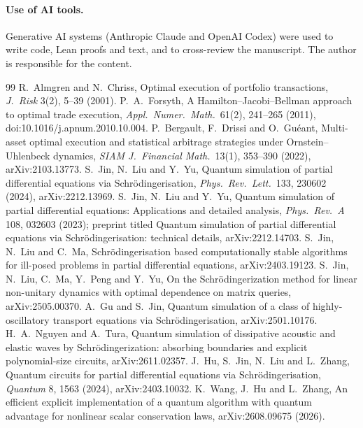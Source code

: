 \documentclass[11pt,a4paper]{article}
\theoremstyle{remark}
\begin{document}
\paragraph{Use of AI tools.} Generative AI systems (Anthropic Claude and OpenAI Codex) were used to write code, Lean proofs and text, and to
cross-review the manuscript. The author is responsible for the content.

\begin{thebibliography}{99}\small
{} R.~Almgren and N.~Chriss, Optimal execution of portfolio transactions, \emph{J.~Risk} 3(2), 5--39 (2001).
 P.~A.~Forsyth, A Hamilton--Jacobi--Bellman approach to optimal trade execution, \emph{Appl.~Numer.~Math.}~61(2), 241--265 (2011), doi:10.1016/j.apnum.2010.10.004.
 P.~Bergault, F.~Drissi and O.~Gu\'eant, Multi-asset optimal execution and statistical arbitrage strategies under Ornstein--Uhlenbeck dynamics, \emph{SIAM J.~Financial Math.}~13(1), 353--390 (2022), arXiv:2103.13773.
 S.~Jin, N.~Liu and Y.~Yu, Quantum simulation of partial differential equations via Schr\"odingerisation, \emph{Phys.~Rev.~Lett.}~133, 230602 (2024), arXiv:2212.13969.
 S.~Jin, N.~Liu and Y.~Yu, Quantum simulation of partial differential equations: Applications and detailed analysis, \emph{Phys.~Rev.~A} 108, 032603 (2023); preprint titled Quantum simulation of partial differential equations via Schr\"odingerisation: technical details, arXiv:2212.14703.
 S.~Jin, N.~Liu and C.~Ma, Schr\"odingerisation based computationally stable algorithms for ill-posed problems in partial differential equations, arXiv:2403.19123.
 S.~Jin, N.~Liu, C.~Ma, Y.~Peng and Y.~Yu, On the Schr\"odingerization method for linear non-unitary dynamics with optimal dependence on matrix queries, arXiv:2505.00370.
 A.~Gu and S.~Jin, Quantum simulation of a class of highly-oscillatory transport equations via Schr\"odingerisation, arXiv:2501.10176.
 H.~A.~Nguyen and A.~Tura, Quantum simulation of dissipative acoustic and elastic waves by Schr\"odingerization: absorbing boundaries and explicit polynomial-size circuits, arXiv:2611.02357.
 J.~Hu, S.~Jin, N.~Liu and L.~Zhang, Quantum circuits for partial differential equations via Schr\"odingerisation, \emph{Quantum} 8, 1563 (2024), arXiv:2403.10032.
 K.~Wang, J.~Hu and L.~Zhang, An efficient explicit implementation of a quantum algorithm with quantum advantage for nonlinear scalar conservation laws, arXiv:2608.09675 (2026).

\end{thebibliography}
\end{document}
